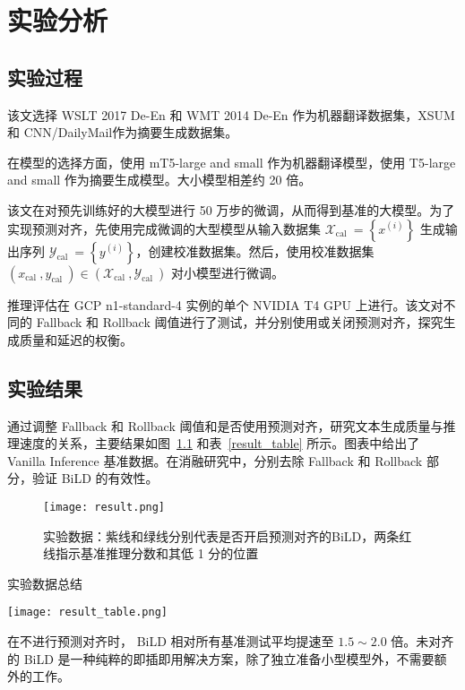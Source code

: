 \chapter{实验分析}

\section{实验过程}

该文选择 WSLT 2017 De-En 和 WMT 2014 De-En 作为机器翻译数据集，XSUM 和 CNN/DailyMail作为摘要生成数据集。

在模型的选择方面，使用 mT5-large and small 作为机器翻译模型，使用 T5-large and small  作为摘要生成模型。大小模型相差约 20 倍。

该文在对预先训练好的大模型进行 50 万步的微调，从而得到基准的大模型。为了实现预测对齐，先使用完成微调的大型模型从输入数据集 $\mathcal{X}_{\text {cal }}=\left\{x^{(i)}\right\}$ 生成输出序列 $\mathcal{Y}_{\text {cal }}=\left\{y^{(i)}\right\}$，创建校准数据集。然后，使用校准数据集 $\left(x_{\text {cal }}, y_{\text {cal }}\right) \in\left(\mathcal{X}_{\text {cal }}, \mathcal{Y}_{\text {cal }}\right)$ 对小模型进行微调。

推理评估在 GCP n1-standard-4 实例的单个 NVIDIA T4 GPU 上进行。该文对不同的 Fallback 和 Rollback 阈值进行了测试，并分别使用或关闭预测对齐，探究生成质量和延迟的权衡。

\section{实验结果}

通过调整 Fallback 和 Rollback 阈值和是否使用预测对齐，研究文本生成质量与推理速度的关系，主要结果如图~\ref{result} 和表~\ref{result_table} 所示。图表中给出了 Vanilla Inference 基准数据。在消融研究中，分别去除 Fallback 和 Rollback 部分，验证 BiLD 的有效性。

\begin{figure}[htbp]
    \centering
    \texttt{[image: result.png]}
    \caption{实验数据：紫线和绿线分别代表是否开启预测对齐的BiLD，两条红线指示基准推理分数和其低 1 分的位置}
    \label{result}
\end{figure}

\begin{table}[htbp]
    \centering
    \caption{实验数据总结}
    \texttt{[image: result\_table.png]}
    \label{result_table}
\end{table}
在不进行预测对齐时， BiLD 相对所有基准测试平均提速至 $1.5\sim 2.0$ 倍。未对齐的 BiLD 是一种纯粹的即插即用解决方案，除了独立准备小型模型外，不需要额外的工作。

